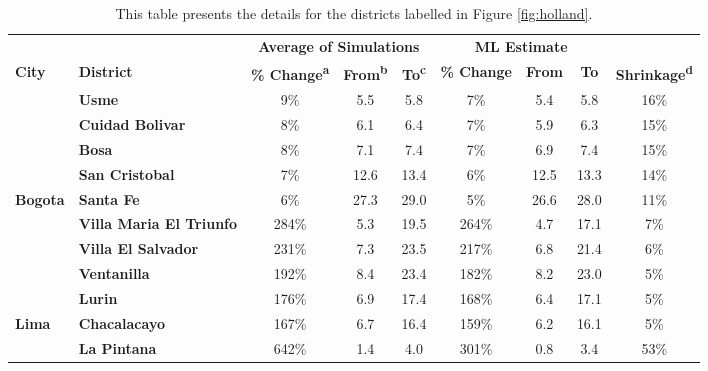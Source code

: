 \begin{table}[!h]

\caption{\label{tab:top-5}This table presents the details for the districts labelled in Figure \ref{fig:holland}.}
\centering
\fontsize{8}{10}\selectfont
\begin{tabular}[t]{>{}l>{}lccccccc}
\toprule
\multicolumn{2}{c}{\textbf{ }} & \multicolumn{3}{c}{\textbf{Average of Simulations}} & \multicolumn{3}{c}{\textbf{ML Estimate}} & \multicolumn{1}{c}{\textbf{ }} \\
\cmidrule(l{3pt}r{3pt}){3-5} \cmidrule(l{3pt}r{3pt}){6-8}
\textbf{City} & \textbf{District} & \textbf{\% Change\textsuperscript{a}} & \textbf{From\textsuperscript{b}} & \textbf{To\textsuperscript{c}} & \textbf{\% Change} & \textbf{From} & \textbf{To} & \textbf{Shrinkage\textsuperscript{d}}\\
\midrule
 & \textbf{Usme} & 9\% & 5.5 & 5.8 & 7\% & 5.4 & 5.8 & 16\%\\

 & \textbf{Cuidad Bolivar} & 8\% & 6.1 & 6.4 & 7\% & 5.9 & 6.3 & 15\%\\

 & \textbf{Bosa} & 8\% & 7.1 & 7.4 & 7\% & 6.9 & 7.4 & 15\%\\

 & \textbf{San Cristobal} & 7\% & 12.6 & 13.4 & 6\% & 12.5 & 13.3 & 14\%\\

\multirow{-5}{*}{\raggedright\arraybackslash \textbf{Bogota}} & \textbf{Santa Fe} & 6\% & 27.3 & 29.0 & 5\% & 26.6 & 28.0 & 11\%\\
\cmidrule{1-9}
 & \textbf{Villa Maria El Triunfo} & 284\% & 5.3 & 19.5 & 264\% & 4.7 & 17.1 & 7\%\\

 & \textbf{Villa El Salvador} & 231\% & 7.3 & 23.5 & 217\% & 6.8 & 21.4 & 6\%\\

 & \textbf{Ventanilla} & 192\% & 8.4 & 23.4 & 182\% & 8.2 & 23.0 & 5\%\\

 & \textbf{Lurin} & 176\% & 6.9 & 17.4 & 168\% & 6.4 & 17.1 & 5\%\\

\multirow{-5}{*}{\raggedright\arraybackslash \textbf{Lima}} & \textbf{Chacalacayo} & 167\% & 6.7 & 16.4 & 159\% & 6.2 & 16.1 & 5\%\\
\cmidrule{1-9}
 & \textbf{La Pintana} & 642\% & 1.4 & 4.0 & 301\% & 0.8 & 3.4 & 53\%\\


\end{tabular}
\end{table}
